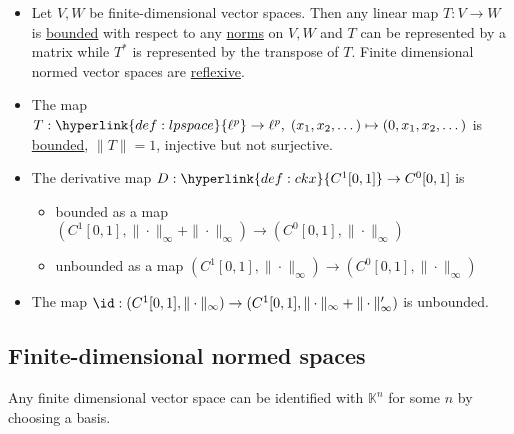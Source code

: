 \documentclass{article}
\newcommand{\K}{\mathbb{K}}
\begin{document}

\begin{eg}
    \leavevmode
    \begin{itemize}
        \item Let $V, W$ be finite-dimensional vector spaces.
            Then any linear map $T:V \to W$ is \hyperlink{def:boundedLinearMap}{bounded} with respect to any \hyperlink{def:nvs}{norms} on $V, W$ and $T$ can be represented by a matrix while \hyperlink{def:dualMap}{$T^*$} is represented by the transpose of $T$.
            Finite dimensional normed vector spaces are \hyperlink{def:reflexive}{reflexive}.
        \item The map $T : \hyperlink{def:lpspace}{\ell^p} \to \ell^p, \; (x_1, x_2, \dotsc) \mapsto (0, x_1, x_2, \dotsc)$ is \hyperlink{def:boundedLinearMap}{bounded}, $\|T\| = 1$, injective but not surjective.
        \item The derivative map $D: \hyperlink{def:ckx}{C^1 [0, 1]} \to C^0 [0, 1]$ is
            \begin{itemize}[label={}]
                \item bounded as a map $(C^1 [0, 1], \|\cdot\|_\infty + \|\cdot\|_\infty) \to (C^0[0, 1], \|\cdot\|_\infty)$
                \item unbounded as a map $(C^1 [0, 1], \|\cdot\|_\infty) \to (C^0[0, 1], \|\cdot\|_\infty)$
            \end{itemize}
        \item The map $\id: (C^1[0, 1], \|\cdot\|_\infty) \to (C^1[0, 1], \|\cdot\|_\infty + \|\cdot\|'_\infty)$ is unbounded.
    \end{itemize}
\end{eg}

\subsection{Finite-dimensional normed spaces}
\begin{fact}
    Any finite dimensional vector space can be identified with $\K^n$ for some $n$ by choosing a basis.
\end{fact}

\end{document}
